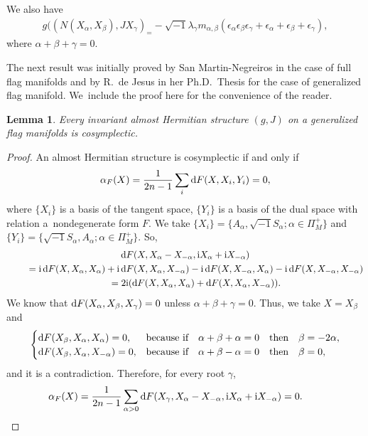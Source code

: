 \documentclass[pdftex]{sigma}%
\numberwithin{equation}{section}
\newtheorem{Lemma}[Theorem]{Lemma}
\begin{document}
We also have
\begin{gather*}
g((N(X_{\alpha},X_{\beta}),J X_{\gamma})_=-\sqrt{-1}\lambda_{\gamma}m_{\alpha,\beta}(\epsilon_{\alpha}\epsilon_{\beta}\epsilon_{\gamma}
+\epsilon_{\alpha}+\epsilon_{\beta}+\epsilon_{\gamma}),
\end{gather*}
where $\alpha+\beta+\gamma=0$.

The next result was initially proved by San Martin-Negreiros \cite{sn} in the case of full flag manifolds and by R.~de Jesus in her Ph.D.~Thesis for the case of generalized flag manifold. We~include the proof here for the convenience of the reader.
\begin{Lemma}\label{lema-sm-neg}
Every invariant almost Hermitian structure $(g,J)$ on a generalized flag manifolds is cosymplectic.
\end{Lemma}
\begin{proof}
An almost Hermitian structure is cosymplectic if and only if
\begin{gather*}
\alpha_{F}(X)=\dfrac{1}{2n-1}\sum_{i}{\rm d}F(X,X_{i},Y_{i})=0,
\end{gather*}
where $\{X_{i}\}$ is a basis of the tangent space, $\{Y_{i}\}$ is a basis of the dual space with relation a~nondegenerate form $F$. We take $\{X_{i}\}=\big\{A_{\alpha}, \sqrt{-1}S_{\alpha};\alpha\in \Pi^{+}_M \big\}$ and $\{Y_{i}\}=\big\{\sqrt{-1}S_{\alpha}, A_{\alpha};\allowbreak \alpha\in \Pi^{+}_M \big\} $. So,
\begin{gather*}
{\rm d}F(X,X_{\alpha}-X_{-\alpha},{\rm i}X_{\alpha}+{\rm i}X_{-\alpha})
\\ \qquad
{}={\rm i}\,{\rm d}F(X,X_{\alpha},X_{\alpha})+{\rm i}\,{\rm d}F(X,X_{\alpha},X_{-\alpha})
-{\rm i}\,{\rm d}F(X,X_{-\alpha},X_{\alpha})-{\rm i}\,{\rm d}F(X,X_{-\alpha},X_{-\alpha})
\\ \qquad
{}=2{\rm i}({\rm d}F(X,X_{\alpha},X_{\alpha})+{\rm d}F(X,X_{\alpha},X_{-\alpha})).
\end{gather*}
We know that ${\rm d}F(X_{\alpha},X_{\beta}, X_{\gamma})=0$ unless $\alpha+\beta+\gamma=0$.
Thus, we take $X=X_{\beta}$ and
\begin{gather*}
\begin{cases}
{\rm d}F(X_{\beta},X_{\alpha}, X_{\alpha})=0,&\text{because if} \quad\alpha+\beta+\alpha=0 \quad \text{then} \quad \beta=-2\alpha,
\\
{\rm d}F(X_{\beta},X_{\alpha}, X_{-\alpha})=0,&\text{because if}\quad\alpha+\beta-\alpha=0 \quad \text{then} \quad \beta=0,
\end{cases}
\end{gather*}
and it is a contradiction.
Therefore, for every root $\gamma$,
\begin{gather*}
\alpha_{F}(X)=\dfrac{1}{2n-1}\sum_{\alpha>0}{\rm d}F(X_{\gamma},X_{\alpha}-X_{-\alpha},{\rm i}X_{\alpha}+{\rm i}X_{-\alpha})=0.\tag*{\qed}
\end{gather*}
\renewcommand{\qed}{}
\end{proof}
\end{document}
